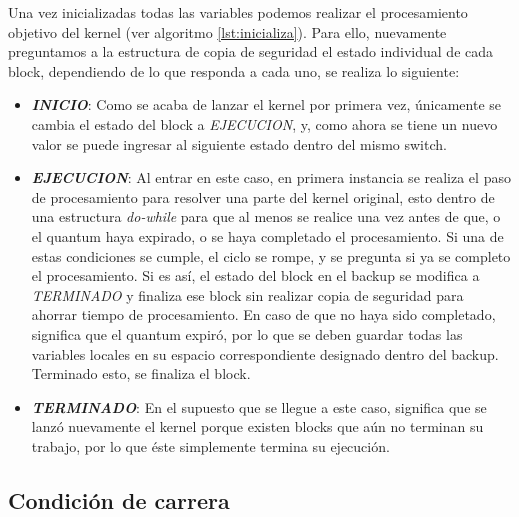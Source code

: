 

Una vez inicializadas todas las variables podemos realizar el procesamiento objetivo del kernel (ver algoritmo \ref{lst:inicializa}). Para ello, nuevamente preguntamos a la estructura de copia de seguridad el estado individual de cada block, dependiendo de lo que responda a cada uno, se realiza lo siguiente:



\begin{itemize}
\item \textit{\textbf{INICIO}}: Como se acaba de lanzar el kernel por primera vez, únicamente se cambia el estado del block a \textit{EJECUCION}, y, como ahora se tiene un nuevo valor se puede ingresar al siguiente estado dentro del mismo switch.

\item \textit{\textbf{EJECUCION}}: Al entrar en este caso, en primera instancia se realiza el paso de procesamiento para resolver una parte del kernel original, esto dentro de una estructura \textit{do-while} para que al menos se realice una vez antes de que, o el quantum haya expirado, o se haya completado el procesamiento. Si una de estas condiciones se cumple, el ciclo se rompe, y se pregunta si ya se completo el procesamiento. Si es así, el estado del block en el backup se modifica a \textit{TERMINADO} y finaliza ese block sin realizar copia de seguridad para ahorrar tiempo de procesamiento.
En caso de que no haya sido completado, significa que el quantum expiró, por lo que se deben guardar todas las variables locales en su espacio correspondiente designado dentro del backup. Terminado esto, se finaliza el block.

\item \textit{\textbf{TERMINADO}}: En el supuesto que se llegue a este caso, significa que se lanzó nuevamente el kernel porque existen blocks que aún no terminan su trabajo, por lo que éste simplemente termina su ejecución.
\end{itemize}



\subsection{Condición de carrera}

